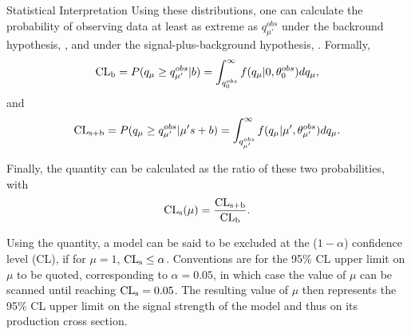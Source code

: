 \begin{section}{Statistical Interpretation}
Using these distributions, one can calculate the probability of observing data at least as extreme as $q^{obs}_{\mu'}$ under the backround hypothesis, \CLb, and under the signal-plus-background hypothesis, \CLsb.
Formally,
\begin{align}
\textrm{CL}_\textrm{b} = P(q_{\mu} \geq q^{obs}_{\mu'}|b) = \int^{\infty}_{q^{obs}_{0}} f(q_{\mu}|0,\theta^{obs}_{0}) dq_{\mu},
\end{align}
and
\begin{align}
\textrm{CL}_\textrm{s+b} = P(q_{\mu} \geq q^{obs}_{\mu'}|\mu's+b) = \int^{\infty}_{q^{obs}_{\mu'}} f(q_{\mu}|\mu',\theta^{obs}_{\mu'}) dq_{\mu}.
\end{align}
\end{section}
Finally, the \CLs quantity can be calculated as the ratio of these two probabilities, with
\begin{align}
\textrm{CL}_\textrm{s}(\mu) = \frac{\textrm{CL}_\textrm{s+b}}{\textrm{CL}_\textrm{b}}.
\end{align}

Using the \CLs quantity, a model can be said to be excluded at the ($1 - \alpha$) confidence level (CL), if for $\mu = 1$, $\textrm{CL}_\textrm{s} \leq \alpha$.
Conventions are for the 95\% CL upper limit on $\mu$ to be quoted, corresponding to $\alpha = 0.05$, in which case the value of $\mu$ can be scanned until reaching $\textrm{CL}_\textrm{s} = 0.05$.
The resulting value of $\mu$ then represents the 95\% CL upper limit on the signal strength of the model and thus on its production cross section.

